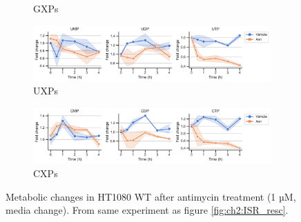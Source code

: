 \begin{figure}[ht]
\begin{subfigure}[b]{0.63\textwidth}
        \caption{GXPs}
        \label{fig:app_ch2:HT1080_Anti_gxp}
    \end{subfigure}
    \hfill
    \begin{subfigure}[b]{0.63\textwidth}
        \includegraphics[width=\textwidth]{figures/chap2/app/HT1080_Anti_uxp.pdf}
        \caption{UXPs}
        \label{fig:app_ch2:HT1080_Anti_uxp}
    \end{subfigure}
    \hfill
    \begin{subfigure}[b]{0.63\textwidth}
        \includegraphics[width=\textwidth]{figures/chap2/app/HT1080_Anti_cxp.pdf}
        \caption{CXPs}
        \label{fig:app_ch2:HT1080_Anti_cxp}
    \end{subfigure}
    \hfill
        \caption[Metabolic changes in HT1080 after antimycin treatment.]{
        Metabolic changes in HT1080 WT after antimycin treatment (1 µM, media change).
        From same experiment as figure \ref{fig:ch2:ISR_resc}.
        }
        \label{fig:app_ch2:HT1080_Anti_metab}
\end{figure}



